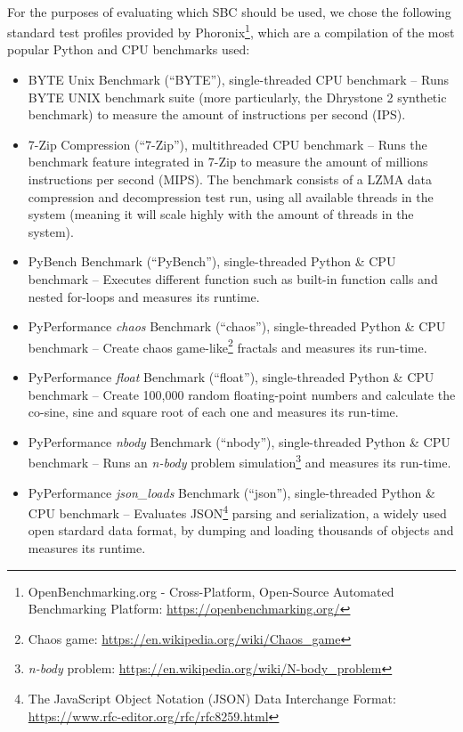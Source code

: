 \paragraph{} For the purposes of evaluating which \acs{SBC} should be used, we chose the following standard test profiles provided by Phoronix\footnote{OpenBenchmarking.org - Cross-Platform, Open-Source Automated Benchmarking Platform: \url{https://openbenchmarking.org/}}, which are a compilation of the most popular Python and CPU benchmarks used:

\begin{itemize}
    \item BYTE Unix Benchmark (``BYTE''), single-threaded CPU benchmark -- Runs BYTE UNIX benchmark suite (more particularly, the Dhrystone 2 synthetic benchmark) to measure the amount of instructions per second (IPS). 
    \item 7-Zip Compression (``7-Zip''), multithreaded CPU benchmark -- Runs the benchmark feature integrated in 7-Zip to measure the amount of millions instructions per second (MIPS). The benchmark consists of a LZMA data compression and decompression test run, using all available threads in the system (meaning it will scale highly with the amount of threads in the system). 
    \item PyBench Benchmark (``PyBench''), single-threaded Python \& CPU benchmark -- Executes different function such as built-in function calls and nested for-loops and measures its runtime.
    \item PyPerformance \textit{chaos} Benchmark (``chaos''), single-threaded Python \& CPU benchmark -- Create chaos game-like\footnote{Chaos game: \url{https://en.wikipedia.org/wiki/Chaos_game}} fractals and measures its run-time. 
    \item PyPerformance \textit{float} Benchmark (``float''), single-threaded Python \& CPU benchmark -- Create 100,000 random floating-point numbers and calculate the co-sine, sine and square root of each one and measures its run-time.
    \item PyPerformance \textit{nbody} Benchmark (``nbody''), single-threaded Python \& CPU benchmark -- Runs an \textit{n-body} problem simulation\footnote{\textit{n-body} problem: \url{https://en.wikipedia.org/wiki/N-body_problem}} and measures its run-time.
    \item PyPerformance \textit{json\_loads} Benchmark (``json''), single-threaded Python \& CPU benchmark -- Evaluates \acf{JSON}\footnote{The JavaScript Object Notation (JSON) Data Interchange Format: \url{https://www.rfc-editor.org/rfc/rfc8259.html}} parsing and serialization, a widely used open stardard data format, by dumping and loading thousands of objects and measures its runtime.

\end{itemize}
